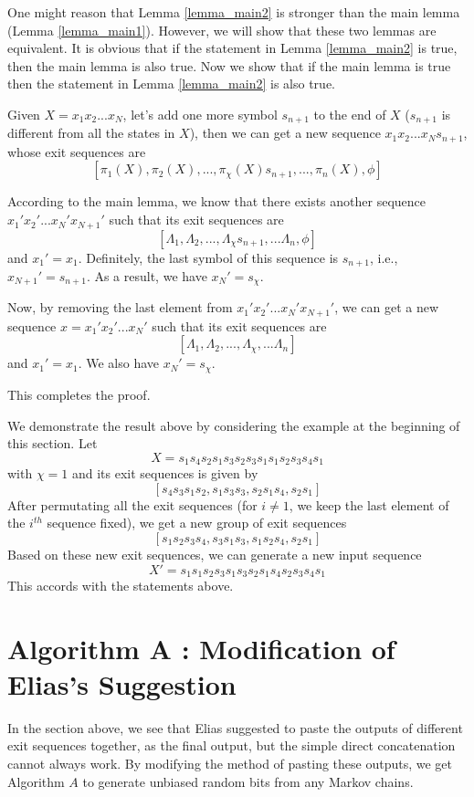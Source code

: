 \documentclass[journal]{IEEEtran}
\begin{document}
One might reason that Lemma \ref{lemma_main2} is stronger than the main lemma (Lemma \ref{lemma_main1}). However, we will show that these
two lemmas are equivalent. It is obvious that if the statement in Lemma \ref{lemma_main2} is true, then the main lemma is also true. Now we show that
if the main lemma is true then the statement in Lemma \ref{lemma_main2} is also true.

\proof Given  $X=x_1x_2...x_N$, let's add one more symbol $s_{n+1}$ to the end of $X$ ($s_{n+1}$ is different from all the states in $X$), then we can get a new sequence $x_1x_2...x_Ns_{n+1}$, whose exit sequences are
$$[\pi_1(X),\pi_2(X),...,\pi_{\chi}(X)s_{n+1},...,\pi_n(X),\phi]$$

According to the main lemma, we know that there exists another sequence $x_1'x_2'...x_N'x_{N+1}'$ such that its exit sequences are
$$[\Lambda_1,\Lambda_2,...,\Lambda_{\chi}s_{n+1},...\Lambda_n, \phi]$$ and $x_1'=x_1$. Definitely, the last symbol of this sequence is $s_{n+1}$, i.e.,
$x_{N+1}'=s_{n+1}$. As a result, we have $x_N'=s_\chi$.

Now, by removing the last element from $x_1'x_2'...x_N'x_{N+1}'$, we can get a new sequence $x=x_1'x_2'...x_N'$ such that its exit
sequences are $$[\Lambda_1,\Lambda_2,...,\Lambda_{\chi},...\Lambda_n]$$
and  $x_1'=x_1$. We also have $x_N'=s_\chi$.

This completes the proof.
\hfill\QED

We demonstrate the result above by considering
the example at the beginning of this section. Let
$$X=s_1s_4s_2 s_1 s_3s_2 s_3 s_1 s_1s_2s_3s_4s_1$$
with $\chi=1$ and its exit sequences is given by
$$[s_4 s_3 s_1s_2, s_1s_3s_3, s_2s_1s_4, s_2s_1]$$
After permutating all the exit sequences (for $i\neq 1$, we keep the last element of the $i^{th}$ sequence fixed),
we get a new group of exit sequences
$$[s_1s_2s_3s_4 , s_3s_1s_3, s_1s_2s_4, s_2s_1]$$
Based on these new exit sequences, we can generate a new input sequence
$$X'=s_1s_1s_2s_3s_1s_3s_2s_1s_4s_2s_3s_4s_1$$
This accords with the statements above.

\section{Algorithm A : Modification of Elias's Suggestion}
\label{section_finite}

In the section above, we see that Elias suggested to paste the outputs of different exit sequences together, as the final output, but
the simple direct concatenation cannot always work. By modifying the method of pasting these outputs, we get Algorithm $A$
to generate unbiased random bits from any Markov chains.
\end{document}
